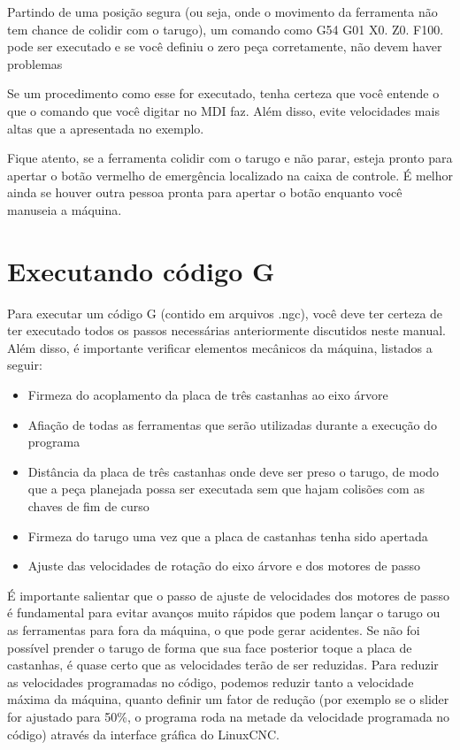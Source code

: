 \documentclass[twoside,a4paper]{refart}
\begin{document}
Partindo de uma posição segura (ou seja, onde o movimento da ferramenta não tem chance de colidir com o tarugo), um comando como G54 G01 X0. Z0. F100. pode ser executado e se você definiu o zero peça corretamente, não devem haver problemas

\attention Se um procedimento como esse for executado, tenha certeza que você entende o que o comando que você digitar no MDI faz. Além disso, evite velocidades mais altas que a apresentada no exemplo.

\attention Fique atento, se a ferramenta colidir com o tarugo e não parar, esteja pronto para apertar o botão vermelho de emergência localizado na caixa de controle. É melhor ainda se houver outra pessoa pronta para apertar o botão enquanto você manuseia a máquina. 

\section{Executando código G}

Para executar um código G (contido em arquivos .ngc), você deve ter certeza de ter executado todos os passos necessárias anteriormente discutidos neste manual. Além disso, é importante verificar elementos mecânicos da máquina, listados a seguir:

\begin{itemize}
    \item Firmeza do acoplamento da placa de três castanhas ao eixo árvore 
    \item Afiação de todas as ferramentas que serão utilizadas durante a execução do programa 
    \item Distância da placa de três castanhas onde deve ser preso o tarugo, de modo que a peça planejada possa ser executada sem que hajam colisões com as chaves de fim de curso
    \item Firmeza do tarugo uma vez que a placa de castanhas tenha sido apertada
    \item Ajuste das velocidades de rotação do eixo árvore e dos motores de passo
\end{itemize}

É importante salientar que o passo de ajuste de velocidades dos motores de passo é fundamental para evitar avanços muito rápidos que podem lançar o tarugo ou as ferramentas para fora da máquina, o que pode gerar acidentes. Se não foi possível prender o tarugo de forma que sua face posterior toque a placa de castanhas, é quase certo que as velocidades terão de ser reduzidas. Para reduzir as velocidades programadas no código, podemos reduzir tanto a velocidade máxima da máquina, quanto definir um fator de redução (por exemplo se o slider for ajustado para 50\%, o programa roda na metade da velocidade programada no código) através da interface gráfica do LinuxCNC.
\end{document}
